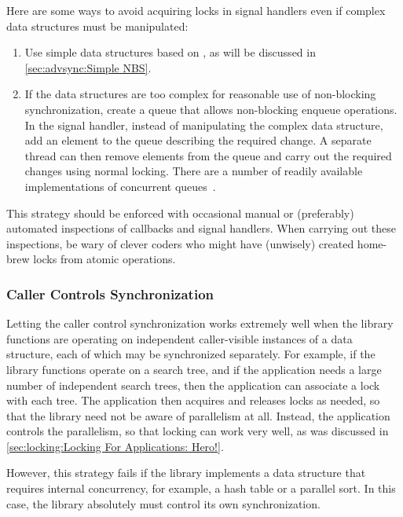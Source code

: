 Here are some ways to avoid acquiring locks in signal handlers even
if complex data structures must be manipulated:

\begin{enumerate}
\item	Use simple data structures based on ,
	as will be discussed in
	\cref{sec:advsync:Simple NBS}.
\item	If the data structures are too complex for reasonable use of
	non-blocking synchronization, create a queue that allows
	non-blocking enqueue operations.
	In the signal handler, instead of manipulating the complex
	data structure, add an element to the queue describing the
	required change.
	A separate thread can then remove elements from the queue and
	carry out the required changes using normal locking.
	There are a number of readily available implementations of
	concurrent
	queues~\cite{ChristophMKirsch2012FIFOisntTR,MathieuDesnoyers2009URCU,MichaelScott96}.
\end{enumerate}

This strategy should be enforced with occasional manual or (preferably)
automated inspections of callbacks and signal handlers.
When carrying out these inspections, be wary of clever coders who
might have (unwisely) created home-brew locks from atomic operations.

\subsubsection{Caller Controls Synchronization}
\label{sec:locking:Caller Controls Synchronization}

Letting the caller control synchronization
works extremely well when the library functions are operating
on independent caller-visible instances of a data structure, each
of which may be synchronized separately.
For example, if the library functions operate on a search tree,
and if the application needs a large number of independent search
trees, then the application can associate a lock with each tree.
The application then acquires and releases locks as needed, so
that the library need not be aware of parallelism at all.
Instead, the application controls the parallelism, so that locking
can work very well, as was discussed in
\cref{sec:locking:Locking For Applications: Hero!}.

However, this strategy fails if the
library implements a data structure that requires internal
concurrency, for example, a hash table or a parallel sort.
In this case, the library absolutely must control its own
synchronization.

